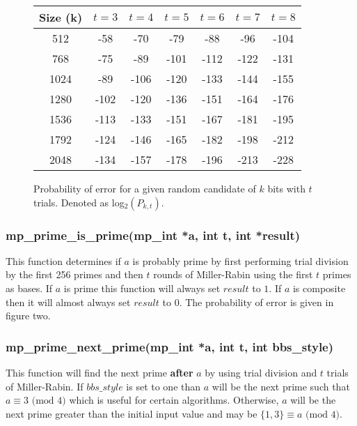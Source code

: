\documentclass[]{article}
\begin{document}
\begin{figure}[here]
\begin{small}
\begin{center}
\begin{tabular}{|c|c|c|c|c|c|c|}
\hline \textbf{Size (k)} & \textbf{$t = 3$} & \textbf{$t = 4$} & \textbf{$t = 5$} & \textbf{$t = 6$} & \textbf{$t = 7$} & \textbf{$t = 8$}\\
\hline 512  & -58 & -70 & -79 & -88 & -96 & -104 \\
\hline 768  & -75 & -89 & -101 & -112 & -122 & -131\\
\hline 1024 & -89 & -106 & -120 & -133 & -144 & -155 \\
\hline 1280 & -102 & -120 & -136 & -151 & -164 & -176 \\
\hline 1536 & -113 & -133 & -151 & -167 & -181 & -195 \\
\hline 1792 & -124 & -146 & -165 & -182 & -198 & -212 \\
\hline 2048 & -134 & -157 & -178 & -196 & -213 & -228\\
\hline
\end{tabular}
\end{center}
\end{small}
\caption{Probability of error for a given random candidate of $k$ bits with $t$ trials.  Denoted as 
log$_2(P_{k,t})$. }
\end{figure}

\subsubsection{mp\_prime\_is\_prime(mp\_int *a, int t, int *result)}
This function determines if $a$ is probably prime by first performing trial division by the first 256 
primes and then $t$ rounds of Miller-Rabin using the first $t$ primes as bases.  If $a$ is prime this
function will always set $result$ to $1$.  If $a$ is composite then it will almost always set $result$
to $0$.  The probability of error is given in figure two.

\subsubsection{mp\_prime\_next\_prime(mp\_int *a, int t, int bbs\_style)}
This function will find the next prime \textbf{after} $a$ by using trial division and $t$ trials of 
Miller-Rabin.  If $bbs\_style$ is set to one than $a$ will be the next prime such that $a \equiv 3 \mbox{ (mod }4\mbox{)}$ 
which is useful for certain algorithms.  Otherwise, $a$ will be the next prime greater than the initial input
value and may be $\lbrace 1, 3 \rbrace \equiv a \mbox{ (mod }4\mbox{)}$.  
\end{document}
